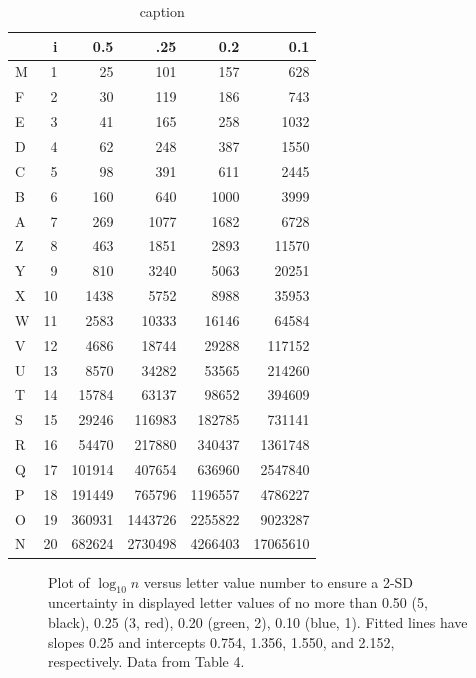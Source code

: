 \documentclass[oneside]{article}
\begin{document}
\begin{table}
  \begin{center}
  \begin{tabular}{lrrrrr}
    \toprule
      &  i &    0.5 &     .25 &     0.2 &      0.1 \\
    \midrule
    M &  1 &     25 &     101 &     157 &      628 \\
    F &  2 &     30 &     119 &     186 &      743 \\
    E &  3 &     41 &     165 &     258 &     1032 \\
    D &  4 &     62 &     248 &     387 &     1550 \\
    C &  5 &     98 &     391 &     611 &     2445 \\
    B &  6 &    160 &     640 &    1000 &     3999 \\
    A &  7 &    269 &    1077 &    1682 &     6728 \\
    Z &  8 &    463 &    1851 &    2893 &    11570 \\
    Y &  9 &    810 &    3240 &    5063 &    20251 \\
    X & 10 &   1438 &    5752 &    8988 &    35953 \\
    W & 11 &   2583 &   10333 &   16146 &    64584 \\
    V & 12 &   4686 &   18744 &   29288 &   117152 \\
    U & 13 &   8570 &   34282 &   53565 &   214260 \\
    T & 14 &  15784 &   63137 &   98652 &   394609 \\
    S & 15 &  29246 &  116983 &  182785 &   731141 \\
    R & 16 &  54470 &  217880 &  340437 &  1361748 \\
    Q & 17 & 101914 &  407654 &  636960 &  2547840 \\
    P & 18 & 191449 &  765796 & 1196557 &  4786227 \\
    O & 19 & 360931 & 1443726 & 2255822 &  9023287 \\
    N & 20 & 682624 & 2730498 & 4266403 & 17065610 \\
    \bottomrule
    
  \end{tabular}
  \end{center}
  \caption{caption}
  \label{tbl:lv-error}
\end{table}


\begin{figure}[hbtp]
  \centering

  \caption{Plot of $\log_10 n$ versus letter value number to ensure a 2-SD
  uncertainty in displayed letter values of no more than 0.50 (5, black), 0.25
  (3, red), 0.20 (green, 2), 0.10 (blue, 1). Fitted lines have slopes 0.25 and
  intercepts 0.754, 1.356, 1.550, and 2.152, respectively. Data from Table 4.}
  \label{figyy} 
\end{figure}
\end{document}
